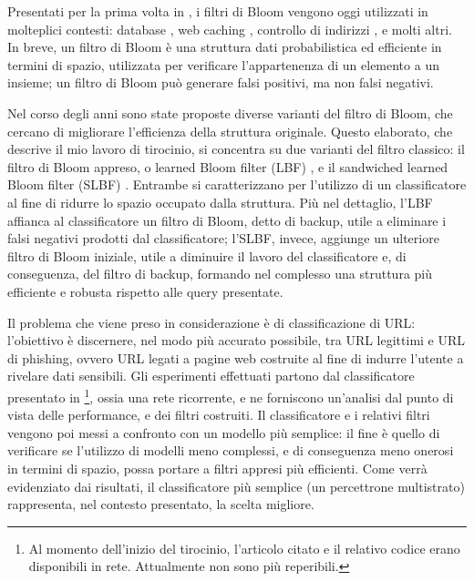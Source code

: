 \documentclass[../../main.tex]{subfiles}
\begin{document}
    
    Presentati per la prima volta in \cite{Bloom1970SpacetimeTI}, i filtri di Bloom vengono oggi utilizzati in molteplici contesti: database \cite{kraska2018case}, web caching \cite{Maggs15algorithmicnuggets}, controllo di indirizzi \cite{Dharmapurikar2006LongestPM}, e molti altri. In breve, un filtro di Bloom è una struttura dati probabilistica ed efficiente in termini di spazio, utilizzata per verificare l'appartenenza di un elemento a un insieme; un filtro di Bloom può generare falsi positivi, ma non falsi negativi.

    Nel corso degli anni sono state proposte diverse varianti del filtro di Bloom, che cercano di migliorare l'efficienza della struttura originale. Questo elaborato, che descrive il mio lavoro di tirocinio, si concentra su due varianti del filtro classico: il filtro di Bloom appreso, o learned Bloom filter (LBF) \cite{kraska2018case}, e il sandwiched learned Bloom filter (SLBF) \cite{10.5555/3326943.3326986}. Entrambe si caratterizzano per l'utilizzo di un classificatore al fine di ridurre lo spazio occupato dalla struttura. Più nel dettaglio, l'LBF affianca al classificatore un filtro di Bloom, detto di backup, utile a eliminare i falsi negativi prodotti dal classificatore; l'SLBF, invece, aggiunge un ulteriore filtro di Bloom iniziale, utile a diminuire il lavoro del classificatore e, di conseguenza, del filtro di backup, formando nel complesso una struttura più efficiente e robusta rispetto alle query presentate.

    Il problema che viene preso in considerazione è di classificazione di URL: l'obiettivo è discernere, nel modo più accurato possibile, tra URL legittimi e URL di phishing, ovvero URL legati a pagine web costruite al fine di indurre l'utente a rivelare dati sensibili. Gli esperimenti effettuati partono dal classificatore presentato in \cite{ma2020}\footnote{Al momento dell'inizio del tirocinio, l'articolo citato e il relativo codice erano disponibili in rete. Attualmente non sono più reperibili.}, ossia una rete ricorrente, e ne forniscono un'analisi dal punto di vista delle performance, e dei filtri costruiti. Il classificatore e i relativi filtri vengono poi messi a confronto con un modello più semplice: il fine è quello di verificare se l'utilizzo di modelli meno complessi, e di conseguenza meno onerosi in termini di spazio, possa portare a filtri appresi più efficienti. Come verrà evidenziato dai risultati, il classificatore più semplice (un percettrone multistrato) rappresenta, nel contesto presentato, la scelta migliore.
\end{document}
